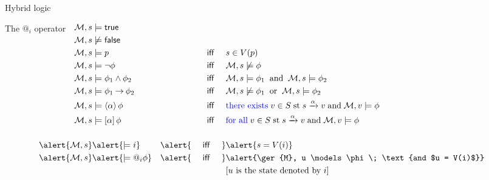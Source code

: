 \documentclass[aspectratio=169]{beamer}
\begin{document}
\begin{slide}{Hybrid logic}\label{s:48}
\small

\begin{block}{The $@_i$ operator}
\begin{align*}
\\[-12mm]
\ger{M}, s & \models \true &&\\
\ger{M}, s & \not \models  \false &&\\
\ger{M}, s & \models  p &  \text{~~~ \textsf{iff} ~~~}  & s \in V(p)\\
\ger{M}, s  & \models \neg \phi  & \text{~~~ \textsf{iff} ~~~} & \ger{M}, s  \not \models \phi \\
\ger{M}, s & \models \phi_1 \land \phi_2  &\text{~~~ \textsf{iff} ~~~} & \ger{M}, s \models  \phi_1 \;\; \text{and}\;\;
                                                   \ger{M}, s \models  \phi_2 \\
\ger{M}, s & \models \phi_1 \impp \phi_2 & \text{~~~ \textsf{iff} ~~~} & \ger{M}, s \not \models \phi_1  \;\; \text{or}\;\; 
                                                  \ger{M}, s \models \phi_2 \\
\ger{M}, s  &\models \evm{\alpha}{\phi} & \text{ ~~~ \textsf{iff} ~~~} &
\text{\blue{there exists}}\; v \in S \;\text{st}\; s \xrightarrow{\alpha} v\; \text{and}\; \ger{M}, v \models \phi\\
\ger{M}, s & \models \alm{\alpha}{\phi} & \text{~~~ \textsf{iff} ~~~} &
\text{\blue{for all}}\; v \in S \; \text{st}\; s \xrightarrow{\alpha} v\; \text{and}\; \ger{M}, v \models \phi
\\[5mm]
\alert{\ger{M}, s} & \alert{\models  i} &  \alert{\text{~~~ \textsf{iff} ~~~}}  & \alert{s = V(i)}\\
\alert{\ger{M}, s} & \alert{\models  @_i \phi}
  &  \alert{\text{~~~ \textsf{iff} ~~~}}  & \alert{\ger{M}, u  \models \phi\; \text{and $u = V(i)$}}
  \\&&& \text{[$u$ is the state denoted by $i$]}
\end{align*}
\end{block}

\end{slide}
\end{document}
